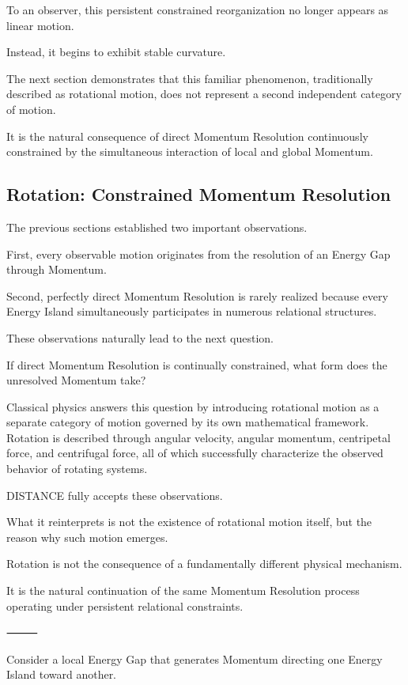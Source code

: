 To an observer, this persistent constrained reorganization no longer appears as linear motion.

Instead, it begins to exhibit stable curvature.

The next section demonstrates that this familiar phenomenon, traditionally described as rotational motion, does not represent a second independent category of motion.

It is the natural consequence of direct Momentum Resolution continuously constrained by the simultaneous interaction of local and global Momentum.

\subsection*{\textbf{Rotation: Constrained Momentum Resolution}}

The previous sections established two important observations.

First, every observable motion originates from the resolution of an Energy Gap through Momentum.

Second, perfectly direct Momentum Resolution is rarely realized because every Energy Island simultaneously participates in numerous relational structures.

These observations naturally lead to the next question.

If direct Momentum Resolution is continually constrained, what form does the unresolved Momentum take?

Classical physics answers this question by introducing rotational motion as a separate category of motion governed by its own mathematical framework. Rotation is described through angular velocity, angular momentum, centripetal force, and centrifugal force, all of which successfully characterize the observed behavior of rotating systems.

DISTANCE fully accepts these observations.

What it reinterprets is not the existence of rotational motion itself, but the reason why such motion emerges.

Rotation is not the consequence of a fundamentally different physical mechanism.

It is the natural continuation of the same Momentum Resolution process operating under persistent relational constraints.

⸻

Consider a local Energy Gap that generates Momentum directing one Energy Island toward another.

